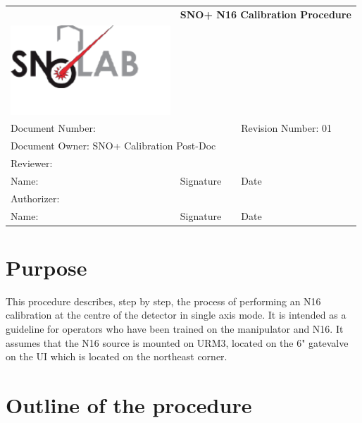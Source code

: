 \documentclass[10pt]{article}
\begin{document}
\begin{tabular}{||l|l|l||}
\hline\hline
& \multicolumn{2}{p{8cm}||}{\bf SNO+ N16 Calibration Procedure} \\
\includegraphics[width=6cm]{../snolablogo.pdf} & \multicolumn{2}{p{8cm}||}{} \\
\hline
\multicolumn{2}{||p{8.5cm}|}{Document Number:} & Revision Number: 01\\
\hline
\multicolumn{3}{||l||}{Document Owner: SNO+ Calibration Post-Doc} \\
\hline
\multicolumn{3}{||l||}{Reviewer:}\\
\hline
Name: & Signature & Date \\
\hline
\multicolumn{3}{||l||}{Authorizer:}\\
\hline
Name: & Signature & Date \\
\hline\hline
\end{tabular}
\thispagestyle{empty}

\section{Purpose}

This procedure describes, step by step, the process of performing an N16 calibration at the centre of the detector in single axis mode. It is intended as a guideline for operators who have been trained on the manipulator and N16. It assumes that the N16 source is mounted on URM3, located on the 6" gatevalve on the UI which is located on the northeast corner.

\section{Outline of the procedure}
\end{document}

